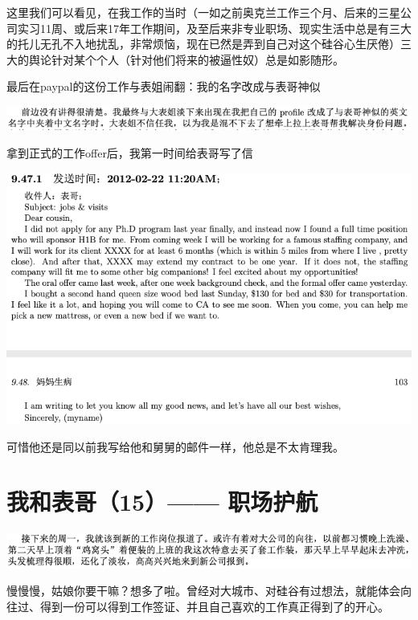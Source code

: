 \documentclass[9pt, b5paper]{article}
\begin{document}
这里我们可以看见，在我工作的当时（一如之前奥克兰工作三个月、后来的三星公司实习11周、或后来17年工作期间，及至后来非专业职场、现实生活中总是有三大的托儿无孔不入地扰乱，非常烦恼，现在已然是弄到自己对这个硅谷心生厌倦）三大的舆论针对某个个人（针对他们将来的被逼性奴）总是如影随形。

最后在paypal的这份工作与表姐闹翻：我的名字改成与表哥神似

\begin{center}
\includegraphics[width=.9\linewidth]{./pic/p1p123-2.png}
\end{center}

拿到正式的工作offer后，我第一时间给表哥写了信

\begin{center}
\includegraphics[width=.9\linewidth]{./pic/p1p103.png}
\end{center}

可惜他还是同以前我写给他和舅舅的邮件一样，他总是不太肯理我。 

\section{我和表哥（15）—— 职场护航}
\label{sec:org8b0a421}

\begin{center}
\includegraphics[width=.9\linewidth]{./pic/p1p103-2.png}
\end{center}

慢慢慢，姑娘你要干嘛？想多了啦。曾经对大城市、对硅谷有过想法，就能体会向往过、得到一份可以得到工作签证、并且自己喜欢的工作真正得到了的开心。 
\end{document}
